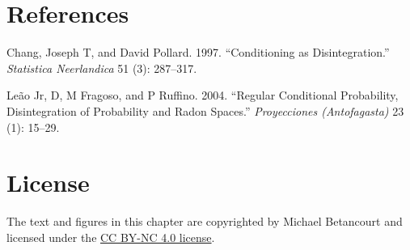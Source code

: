 \documentclass[
  letterpaper,
  DIV=11,
  numbers=noendperiod]{scrartcl}
\newlength{\cslhangindent}
\newenvironment{CSLReferences}[2] %
 {\begin{list}{}{%
  \setlength{\itemindent}{0pt}
  \setlength{\leftmargin}{0pt}
  \setlength{\parsep}{0pt}
  \ifodd #1
   \setlength{\leftmargin}{\cslhangindent}
   \setlength{\itemindent}{-1\cslhangindent}
  \fi
  \setlength{\itemsep}{#2\baselineskip}}}
 {\end{list}}
\begin{document}
\section*{References}\label{references}

\label{refs}
\begin{CSLReferences}{1}{0}
Chang, Joseph T, and David Pollard. 1997. {``Conditioning as
Disintegration.''} \emph{Statistica Neerlandica} 51 (3): 287--317.

Leão Jr, D, M Fragoso, and P Ruffino. 2004. {``Regular Conditional
Probability, Disintegration of Probability and {R}adon Spaces.''}
\emph{Proyecciones (Antofagasta)} 23 (1): 15--29.

\end{CSLReferences}

\section*{License}\label{license}

The text and figures in this chapter are copyrighted by Michael
Betancourt and licensed under the
\href{https://creativecommons.org/licenses/by-nc/4.0/}{CC BY-NC 4.0
license}.
\end{document}
